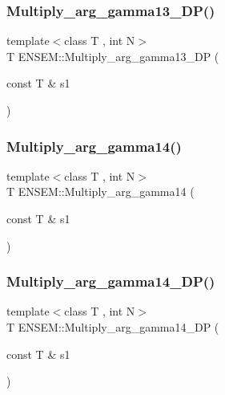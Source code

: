 \mbox{\label{namespaceENSEM_a124549d43453b8c8fe7d8d501c0aadbf}} 
\subsubsection{\texorpdfstring{Multiply\_arg\_gamma13\_DP()}{Multiply\_arg\_gamma13\_DP()}}
{\footnotesize\ttfamily template$<$class T , int N$>$ \\
T E\+N\+S\+E\+M\+::\+Multiply\+\_\+arg\+\_\+gamma13\+\_\+\+DP (\begin{DoxyParamCaption}\item[{const T \&}]{s1 }\end{DoxyParamCaption})\hspace{0.3cm}{\ttfamily [inline]}}

\mbox{\label{namespaceENSEM_af623aded659b9d054073eda60b56ab49}} 
\subsubsection{\texorpdfstring{Multiply\_arg\_gamma14()}{Multiply\_arg\_gamma14()}}
{\footnotesize\ttfamily template$<$class T , int N$>$ \\
T E\+N\+S\+E\+M\+::\+Multiply\+\_\+arg\+\_\+gamma14 (\begin{DoxyParamCaption}\item[{const T \&}]{s1 }\end{DoxyParamCaption})\hspace{0.3cm}{\ttfamily [inline]}}

\mbox{\label{namespaceENSEM_a6ccb5e56860592ee24e7da603a522c7a}} 
\subsubsection{\texorpdfstring{Multiply\_arg\_gamma14\_DP()}{Multiply\_arg\_gamma14\_DP()}}
{\footnotesize\ttfamily template$<$class T , int N$>$ \\
T E\+N\+S\+E\+M\+::\+Multiply\+\_\+arg\+\_\+gamma14\+\_\+\+DP (\begin{DoxyParamCaption}\item[{const T \&}]{s1 }\end{DoxyParamCaption})\hspace{0.3cm}{\ttfamily [inline]}}

